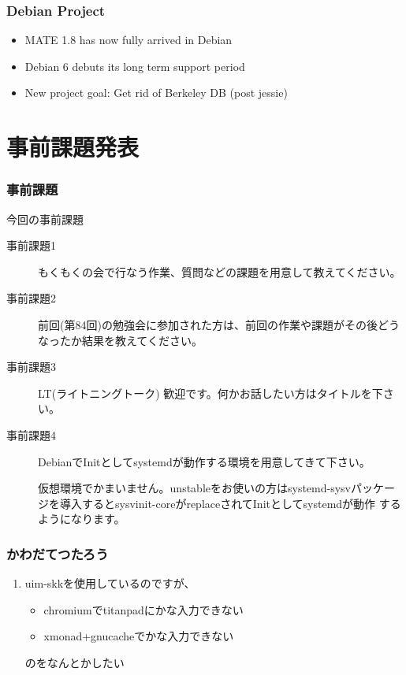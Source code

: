 \documentclass[cjk,dvipdfmx,10pt,compress,%
hyperref={bookmarks=true,bookmarksnumbered=true,bookmarksopen=false,%
colorlinks=false,%
pdftitle={第 85 回 関西 Debian 勉強会},%
pdfauthor={倉敷・のがた・佐々木・かわだ・八津尾},%
pdfsubject={資料},%
}]{beamer}
\begin{document}
\begin{frame}[fragile]
  \frametitle{Debian Project}
  \begin{block}{}
    \begin{itemize}
    \item MATE 1.8 has now fully arrived in Debian
    \item Debian 6 debuts its long term support period
    \item New project goal: Get rid of Berkeley DB (post jessie)
    \end{itemize}
  \end{block}
\end{frame}


\section{事前課題発表}


\begin{frame}[fragile]
  \frametitle{事前課題}
  \begin{block}{今回の事前課題}
    \begin{description}
    \item[事前課題1]
      もくもくの会で行なう作業、質問などの課題を用意して教えてください。
    \item[事前課題2]
      前回(第84回)の勉強会に参加された方は、前回の作業や課題がその後どう
      なったか結果を教えてください。
    \item[事前課題3]
      LT(ライトニングトーク) 歓迎です。何かお話したい方はタイトルを下さい。
    \item[事前課題4]
      DebianでInitとしてsystemdが動作する環境を用意してきて下さい。

      仮想環境でかまいません。unstableをお使いの方はsystemd-sysvパッケー
      ジを導入するとsysvinit-coreがreplaceされてInitとしてsystemdが動作
      するようになります。
    \end{description}
  \end{block}
\end{frame}


\begin{frame}
  \frametitle{ かわだてつたろう }
  \begin{enumerate}
  \item uim-skkを使用しているのですが、
    \begin{itemize}
    \item chromiumでtitanpadにかな入力できない
    \item xmonad+gnucacheでかな入力できない
    \end{itemize}
    のをなんとかしたい
  \end{enumerate}
\end{frame}
\end{document}
